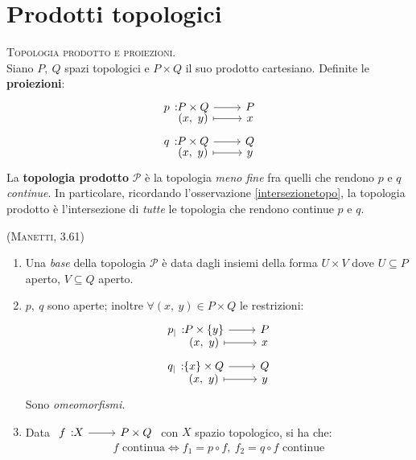 \section{Prodotti topologici}
\begin{define}\textsc{Topologia prodotto e proiezioni.}\\
Siano $P,\ Q$ spazi topologici e $P\times Q$ il suo prodotto cartesiano. Definite le \textbf{proiezioni}:
\begin{gather}
\funztot{p}{P\times Q}{P}{\left(x,\ y\right)}{x}\\
\funztot{q}{P\times Q}{Q}{\left(x,\ y\right)}{y}
\end{gather}
La \textbf{topologia prodotto} $\mathcal{P}$ è la topologia \textit{meno fine} fra quelli che rendono $p$ e $q$ \textit{continue}. In particolare, ricordando l'osservazione \ref{intersezionetopo}, la topologia prodotto è l'intersezione di \textit{tutte} le topologia che rendono continue $p$ e $q$.
\end{define}
\begin{theorema}\textsc{(Manetti, 3.61)}\label{topprodotto}
\begin{enumerate}
\item Una \textit{base} della topologia $\mathcal{P}$ è data dagli insiemi della forma $U\times V$ dove $U\subseteq P$ aperto, $V\subseteq Q$ aperto.
\item $p,\ q$ sono aperte; inoltre $\forall \left(x,\ y\right)\in P\times Q$ le restrizioni:
\begin{gather}
\funztot{p_{\mid}}{P\times \left\{y\right\}}{P}{\left(x,\ y\right)}{x}\\
\funztot{q_{\mid}}{\left\{x\right\}\times Q}{Q}{\left(x,\ y\right)}{y}
\end{gather}
Sono \textit{omeomorfismi}.\\
\item Data $\funz{f}{X}{P\times Q}$ con $X$ spazio topologico, si ha che:
\begin{equation}
f\text{ continua}\iff f_1=p\circ f,\ f_2=q\circ f\text{ continue}
\end{equation}
\end{enumerate}
\vspace{-6mm}
\end{theorema}
